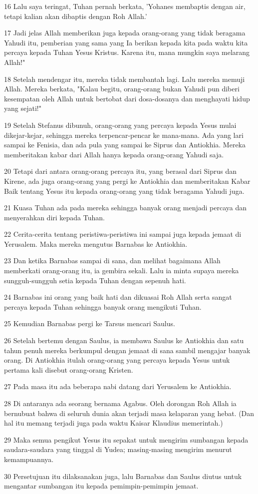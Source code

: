 \par 16 Lalu saya teringat, Tuhan pernah berkata, 'Yohanes membaptis dengan air, tetapi kalian akan dibaptis dengan Roh Allah.'
\par 17 Jadi jelas Allah memberikan juga kepada orang-orang yang tidak beragama Yahudi itu, pemberian yang sama yang Ia berikan kepada kita pada waktu kita percaya kepada Tuhan Yesus Kristus. Karena itu, mana mungkin saya melarang Allah!"
\par 18 Setelah mendengar itu, mereka tidak membantah lagi. Lalu mereka memuji Allah. Mereka berkata, "Kalau begitu, orang-orang bukan Yahudi pun diberi kesempatan oleh Allah untuk bertobat dari dosa-dosanya dan menghayati hidup yang sejati!"
\par 19 Setelah Stefanus dibunuh, orang-orang yang percaya kepada Yesus mulai dikejar-kejar, sehingga mereka terpencar-pencar ke mana-mana. Ada yang lari sampai ke Fenisia, dan ada pula yang sampai ke Siprus dan Antiokhia. Mereka memberitakan kabar dari Allah hanya kepada orang-orang Yahudi saja.
\par 20 Tetapi dari antara orang-orang percaya itu, yang berasal dari Siprus dan Kirene, ada juga orang-orang yang pergi ke Antiokhia dan memberitakan Kabar Baik tentang Yesus itu kepada orang-orang yang tidak beragama Yahudi juga.
\par 21 Kuasa Tuhan ada pada mereka sehingga banyak orang menjadi percaya dan menyerahkan diri kepada Tuhan.
\par 22 Cerita-cerita tentang peristiwa-peristiwa ini sampai juga kepada jemaat di Yerusalem. Maka mereka mengutus Barnabas ke Antiokhia.
\par 23 Dan ketika Barnabas sampai di sana, dan melihat bagaimana Allah memberkati orang-orang itu, ia gembira sekali. Lalu ia minta supaya mereka sungguh-sungguh setia kepada Tuhan dengan sepenuh hati.
\par 24 Barnabas ini orang yang baik hati dan dikuasai Roh Allah serta sangat percaya kepada Tuhan sehingga banyak orang mengikuti Tuhan.
\par 25 Kemudian Barnabas pergi ke Tarsus mencari Saulus.
\par 26 Setelah bertemu dengan Saulus, ia membawa Saulus ke Antiokhia dan satu tahun penuh mereka berkumpul dengan jemaat di sana sambil mengajar banyak orang. Di Antiokhia itulah orang-orang yang percaya kepada Yesus untuk pertama kali disebut orang-orang Kristen.
\par 27 Pada masa itu ada beberapa nabi datang dari Yerusalem ke Antiokhia.
\par 28 Di antaranya ada seorang bernama Agabus. Oleh dorongan Roh Allah ia bernubuat bahwa di seluruh dunia akan terjadi masa kelaparan yang hebat. (Dan hal itu memang terjadi juga pada waktu Kaisar Klaudius memerintah.)
\par 29 Maka semua pengikut Yesus itu sepakat untuk mengirim sumbangan kepada saudara-saudara yang tinggal di Yudea; masing-masing mengirim menurut kemampuannya.
\par 30 Persetujuan itu dilaksanakan juga, lalu Barnabas dan Saulus diutus untuk mengantar sumbangan itu kepada pemimpin-pemimpin jemaat.

